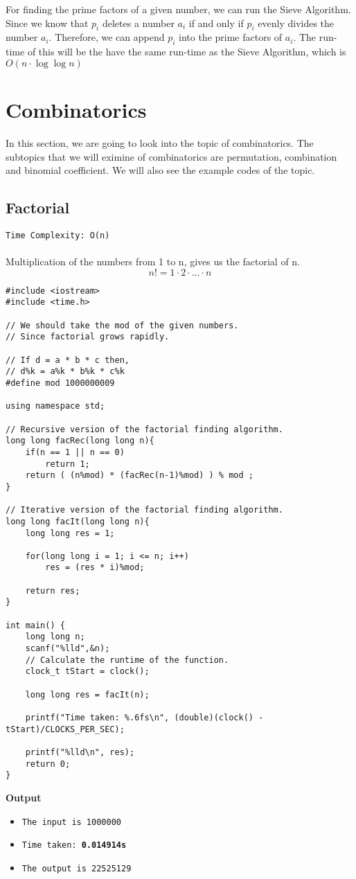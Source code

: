 \documentclass[12pt]{article}
\begin{document}
For finding the prime factors of a given number, we can run the Sieve Algorithm.  Since we know that $p_i$ deletes a number $a_i$ if and only if $p_i$ evenly divides the number $a_i$. Therefore, we can append $p_i$ into the prime factors of $a_i$. The run-time of this will be the have the same run-time as the Sieve Algorithm, which is $O(n \cdot \log{\log{n}})$


\section{Combinatorics}
In this section, we are going to look into the topic of combinatorics. The subtopics that we will eximine of combinatorics are permutation, combination and binomial coefficient. We will also see the example codes of the topic.

\subsection{Factorial}
\texttt{Time Complexity: O(n) } \\ \\
Multiplication of the numbers from 1 to n, gives us the factorial of n.
\[n! = 1 \cdot 2 \cdot ... \cdot n \] 

\clearpage

\begin{verbatim}
#include <iostream>
#include <time.h>

// We should take the mod of the given numbers.
// Since factorial grows rapidly.

// If d = a * b * c then,
// d%k = a%k * b%k * c%k
#define mod 1000000009

using namespace std;

// Recursive version of the factorial finding algorithm.
long long facRec(long long n){
    if(n == 1 || n == 0)
        return 1;
    return ( (n%mod) * (facRec(n-1)%mod) ) % mod ;
}

// Iterative version of the factorial finding algorithm.
long long facIt(long long n){
    long long res = 1;
    
    for(long long i = 1; i <= n; i++)
        res = (res * i)%mod;
    
    return res;
}

int main() {
    long long n;
    scanf("%lld",&n);
    // Calculate the runtime of the function.
    clock_t tStart = clock();
    
    long long res = facIt(n);
    
    printf("Time taken: %.6fs\n", (double)(clock() - tStart)/CLOCKS_PER_SEC);
    
    printf("%lld\n", res);
    return 0;
}
\end{verbatim}
\textbf{Output}
\begin{itemize}
  \item \texttt{The input is 1000000} 
  \item \texttt{Time taken: \textbf{0.014914s}} 
  \item \texttt{The output is 22525129}
\end{itemize}
\end{document}
